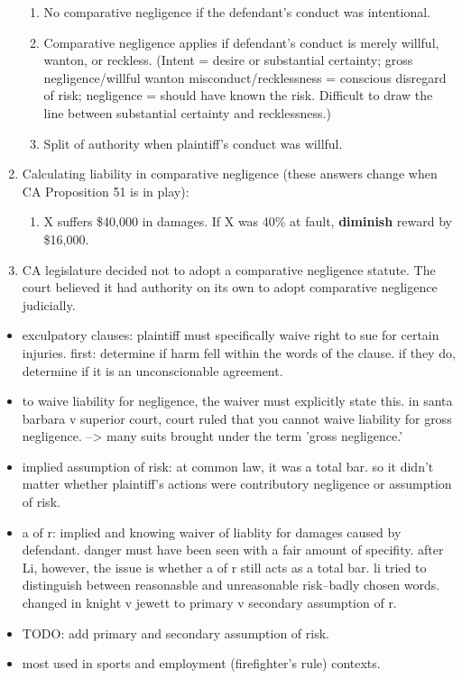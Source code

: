 \begin{enumerate}
\begin{enumerate}
        \item No comparative negligence if the defendant's conduct was intentional.
        \item Comparative negligence applies if defendant's conduct is merely willful, wanton, or reckless. (Intent = desire or substantial certainty; gross negligence/willful wanton misconduct/recklessness = conscious disregard of risk; negligence = should have known the risk. Difficult to draw the line between substantial certainty and recklessness.)
        \item Split of authority when plaintiff's conduct was willful.
    \end{enumerate}
    \item Calculating liability in comparative negligence (these answers change when CA Proposition 51 is in play):
    \begin{enumerate}
        \item X suffers \$40,000 in damages. If X was 40\% at fault, \textbf{diminish} reward by \$16,000.
    \end{enumerate}
    \item CA legislature decided not to adopt a comparative negligence statute. The court believed it had authority on its own to adopt comparative negligence judicially.
\end{enumerate}

\begin{itemize}
    \item exculpatory clauses: plaintiff must specifically waive right to sue for certain injuries. first: determine if harm fell within the words of the clause. if they do, determine if it is an unconscionable agreement.
    \item to waive liability for negligence, the waiver must explicitly state this. in santa barbara v superior court, court ruled that you cannot waive liability for gross negligence. --> many suits brought under the term 'gross negligence.'
    \item implied assumption of risk: at common law, it was a total bar. so it didn't matter whether plaintiff's actions were contributory negligence or assumption of risk.
    \item a of r: implied and knowing waiver of liablity for damages caused by defendant. danger must have been seen with a fair amount of specifity. after Li, however, the issue is whether a of r still acts as a total bar. li tried to distinguish between reasonasble and unreasonable risk--badly chosen words. changed in knight v jewett to primary v secondary assumption of r.
    \item TODO: add primary and secondary assumption of risk.
    \item most used in sports and employment (firefighter's rule) contexts.
\end{itemize}

